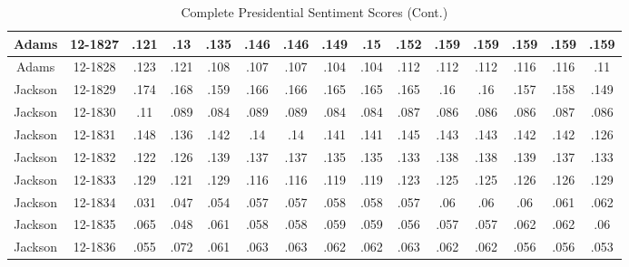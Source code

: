\begin{sidewaystable}
\begin{singlespace}
\begin{center}
\begin{tabular}{||c c c c c c c c c c c c c c c||}
\hline
Adams & 12-1827 & .121 & .13 & .135 & .146 & .146 & .149 & .15 & .152 & .159 & .159 & .159 & .159 & .159 \\ 
\hline
Adams & 12-1828 & .123 & .121 & .108 & .107 & .107 & .104 & .104 & .112 & .112 & .112 & .116 & .116 & .11 \\ 
\hline
Jackson & 12-1829 & .174 & .168 & .159 & .166 & .166 & .165 & .165 & .165 & .16 & .16 & .157 & .158 & .149 \\ 
\hline
Jackson & 12-1830 & .11 & .089 & .084 & .089 & .089 & .084 & .084 & .087 & .086 & .086 & .086 & .087 & .086 \\ 
\hline
Jackson & 12-1831 & .148 & .136 & .142 & .14 & .14 & .141 & .141 & .145 & .143 & .143 & .142 & .142 & .126 \\ 
\hline
Jackson & 12-1832 & .122 & .126 & .139 & .137 & .137 & .135 & .135 & .133 & .138 & .138 & .139 & .137 & .133 \\ 
\hline
Jackson & 12-1833 & .129 & .121 & .129 & .116 & .116 & .119 & .119 & .123 & .125 & .125 & .126 & .126 & .129 \\ 
\hline
Jackson & 12-1834 & .031 & .047 & .054 & .057 & .057 & .058 & .058 & .057 & .06 & .06 & .06 & .061 & .062 \\ 
\hline
Jackson & 12-1835 & .065 & .048 & .061 & .058 & .058 & .059 & .059 & .056 & .057 & .057 & .062 & .062 & .06 \\ 
\hline
Jackson & 12-1836 & .055 & .072 & .061 & .063 & .063 & .062 & .062 & .063 & .062 & .062 & .056 & .056 & .053 \\ 
\hline
 \hline
 \end{tabular}
\end{center}
\caption{Complete Presidential Sentiment Scores (Cont.)}
\label{appendix:sent2}
\end{singlespace}
\end{sidewaystable}

